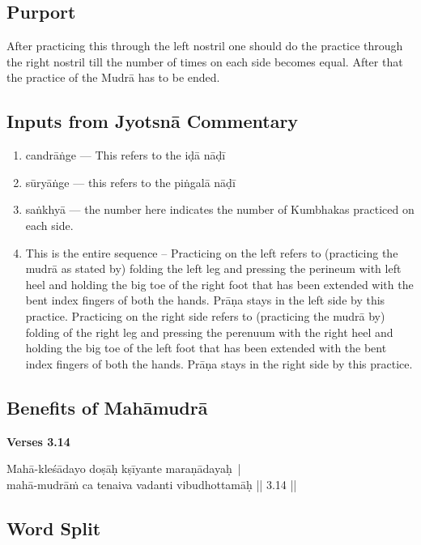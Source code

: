 \subsection*{Purport}

After practicing this through the left nostril one should do the practice through the right nostril till the number of times on each side becomes equal. After that the practice of the Mudrā has to be ended. 

\subsection*{Inputs from Jyotsnā Commentary}

\begin{enumerate}
\item candrāṅge --- This refers to the iḍā nāḍī 
\item sūryāṅge --- this refers to the piṅgalā nāḍī 
\item saṅkhyā --- the number here indicates the number of Kumbhakas practiced on each side. 
\item This is the entire sequence – Practicing on the left refers to (practicing the mudrā  as stated by) folding the left leg and pressing the perineum with left heel and holding the big toe of the right foot that has been extended with the bent index fingers of both the hands. Prāṇa stays in the left side by this practice.  Practicing on the right side refers to (practicing the mudrā  by) folding of the right leg and pressing the perenuum with the right heel and holding the big toe of the left foot that has been extended with the bent index fingers of both the hands. Prāṇa stays in the right side by this practice.
\end{enumerate}

\subsection*{Benefits of Mahāmudrā}

\noindent \textbf{Verses 3.14}

\begin{center}
Mahā-kleśādayo doṣāḥ kṣīyante maraṇādayaḥ |\\ 
mahā-mudrāṁ ca tenaiva vadanti vibudhottamāḥ || 3.14 ||
\end{center}

\subsection*{Word Split}

